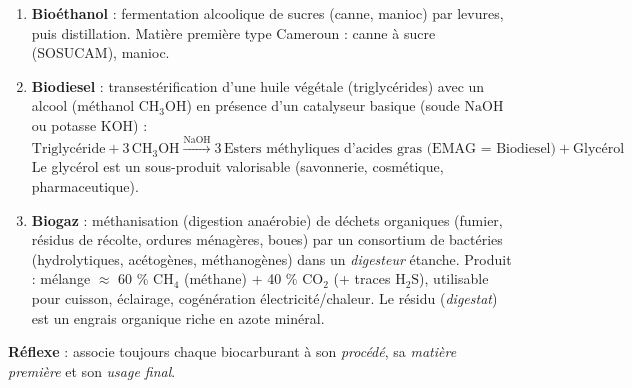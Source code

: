 \documentclass[11pt]{article}
\newcommand{\cle}[1]{{\popxbold\color{popdark}#1}}
\begin{document}
\begin{methode}
\begin{enumerate}
\item \textbf{Bioéthanol} : fermentation alcoolique de sucres (canne, manioc) par levures, puis distillation. Matière première type Cameroun : canne à sucre (SOSUCAM), manioc.
\item \textbf{Biodiesel} : \cle{transestérification} d'une huile végétale (triglycérides) avec un alcool (méthanol $\mathrm{CH_3OH}$) en présence d'un catalyseur basique (soude $\mathrm{NaOH}$ ou potasse $\mathrm{KOH}$) :
\[ \text{Triglycéride} + 3\,\mathrm{CH_3OH} \xrightarrow{\mathrm{NaOH}} 3\,\text{Esters méthyliques d'acides gras (EMAG = Biodiesel)} + \text{Glycérol} \]
Le glycérol est un sous-produit valorisable (savonnerie, cosmétique, pharmaceutique).
\item \textbf{Biogaz} : \cle{méthanisation} (digestion anaérobie) de déchets organiques (fumier, résidus de récolte, ordures ménagères, boues) par un consortium de bactéries (hydrolytiques, acétogènes, méthanogènes) dans un \emph{digesteur} étanche. Produit : mélange $\approx$ 60 \% $\mathrm{CH_4}$ (méthane) + 40 \% $\mathrm{CO_2}$ (+ traces $\mathrm{H_2S}$), utilisable pour cuisson, éclairage, cogénération électricité/chaleur. Le résidu (\emph{digestat}) est un engrais organique riche en azote minéral.
\end{enumerate}
\textbf{Réflexe} : associe toujours chaque biocarburant à son \emph{procédé}, sa \emph{matière première} et son \emph{usage final}.
\end{methode}
\end{document}
